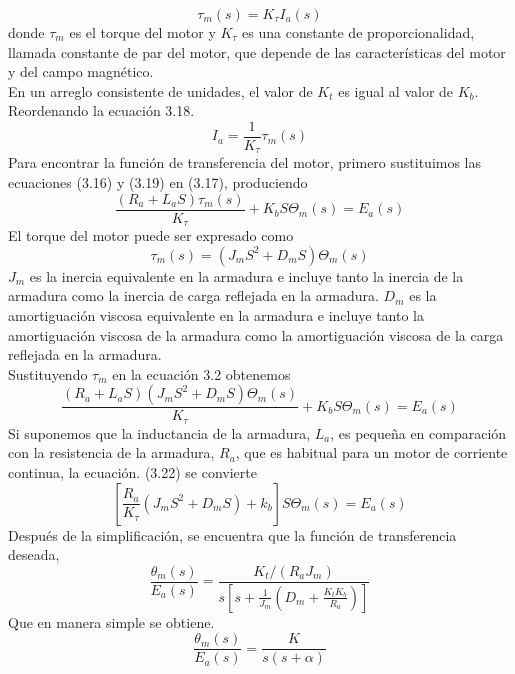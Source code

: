 \begin{equation}
	\tau_m(s) = K_\tau I_a(s)
\end{equation}
donde $\tau_m$ es el torque del motor y $K_\tau$ es una constante de proporcionalidad, llamada constante de par del motor, que depende de las características del motor y del 
campo magnético.\\
En un arreglo consistente de unidades, el valor de $K_t$ es igual al valor de $K_b$. Reordenando la ecuación 3.18.
\begin{equation}
	I_a = \frac{1}{K_\tau} \tau_m (s)
\end{equation}
Para encontrar la función de transferencia del motor, primero sustituimos las ecuaciones (3.16) y (3.19) en (3.17), produciendo
\begin{equation}
	\frac{(R_a + L_aS) \tau_m(s)}{K_\tau} + K_bS \Theta_m(s) = E_a(s)
\end{equation}
El torque del motor puede ser expresado como
\begin{equation}
	\tau_m(s) = (J_mS^2 + D_mS) \Theta_m(s)
\end{equation}
$J_m$ es la inercia equivalente en la armadura e incluye tanto la inercia de la armadura como la inercia de carga reflejada en la armadura. $D_m$ es la amortiguación viscosa 
equivalente en la armadura e incluye tanto la amortiguación viscosa de la armadura como la amortiguación viscosa de la carga reflejada en la armadura.\\
Sustituyendo $\tau_m$ en la ecuación 3.2 obtenemos
\begin{equation}
	\frac{(R_a + L_aS) (J_mS^2 + D_mS) \Theta_m(s) }{K_\tau} + K_bS \Theta_m(s) = E_a(s)
\end{equation}
Si suponemos que la inductancia de la armadura, $L_a$, es pequeña en comparación con la resistencia de la armadura, $R_a$, que es habitual para un motor de corriente continua, 
la ecuación. (3.22) se convierte
\begin{equation}
	\left[ \frac{R_a }{K_\tau} (J_mS^2 + D_mS) + k_b \right] S\Theta_m(s)  = E_a(s)
\end{equation}
Después de la simplificación, se encuentra que la función de transferencia deseada,
\begin{equation}
	\frac{\theta_m (s)}{E_a(s)} = \frac{K_t / (R_aJ_m)}{s \left[ s + \frac{1}{J_m} \left( D_m + \frac{K_tK_b}{R_a} \right) \right]}
\end{equation}
Que en manera simple se obtiene.
\begin{equation}
	\frac{\theta_m (s)}{E_a(s)} = \frac{K}{s(s+\alpha)}
\end{equation}